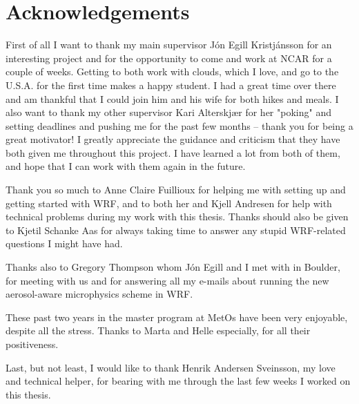 \chapter*{Acknowledgements}

First of all I want to thank my main supervisor Jón Egill Kristjánsson for an interesting project and for the opportunity to come and work at NCAR for a couple of weeks. Getting to both work with clouds, which I love, and go to the U.S.A. for the first time makes a happy student. I had a great time over there and am thankful that I could join him and his wife for both hikes and meals. I also want to thank my other supervisor Kari Alterskjær for her "poking" and setting deadlines and pushing me for the past few months -- thank you for being a great motivator! I greatly appreciate the guidance and criticism that they have both given me throughout this project. I have learned a lot from both of them, and hope that I can work with them again in the future.

Thank you so much to Anne Claire Fuillioux for helping me with setting up and getting started with WRF, and to both her and Kjell Andresen for help with technical problems during my work with this thesis. Thanks should also be given to Kjetil Schanke Aas for always taking time to answer any stupid WRF-related questions I might have had.

Thanks also to Gregory Thompson whom Jón Egill and I met with in Boulder, for meeting with us and for answering all my e-mails about running the new aerosol-aware microphysics scheme in WRF.

These past two years in the master program at MetOs have been very enjoyable, despite all the stress. Thanks to Marta and Helle especially, for all their positiveness.

Last, but not least, I would like to thank Henrik Andersen Sveinsson, my love and technical helper, for bearing with me through the last few weeks I worked on this thesis.
